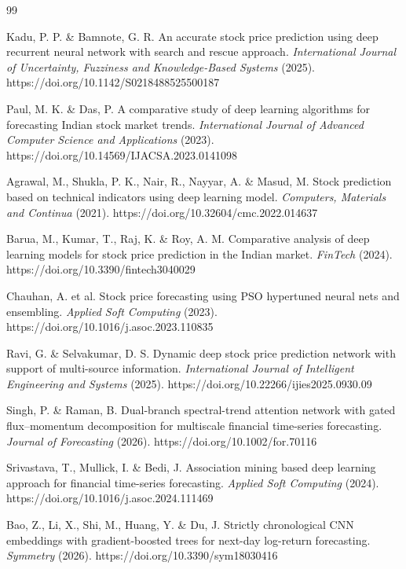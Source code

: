 \documentclass[fleqn,10pt]{wlscirep}
\begin{document}
\begin{thebibliography}{99}

Kadu, P. P. \& Bamnote, G. R. An accurate stock price prediction using deep recurrent neural network with search and rescue approach. \textit{International Journal of Uncertainty, Fuzziness and Knowledge-Based Systems} (2025). https://doi.org/10.1142/S0218488525500187

Paul, M. K. \& Das, P. A comparative study of deep learning algorithms for forecasting Indian stock market trends. \textit{International Journal of Advanced Computer Science and Applications} (2023). https://doi.org/10.14569/IJACSA.2023.0141098

Agrawal, M., Shukla, P. K., Nair, R., Nayyar, A. \& Masud, M. Stock prediction based on technical indicators using deep learning model. \textit{Computers, Materials and Continua} (2021). https://doi.org/10.32604/cmc.2022.014637

Barua, M., Kumar, T., Raj, K. \& Roy, A. M. Comparative analysis of deep learning models for stock price prediction in the Indian market. \textit{FinTech} (2024). https://doi.org/10.3390/fintech3040029

Chauhan, A. et al. Stock price forecasting using PSO hypertuned neural nets and ensembling. \textit{Applied Soft Computing} (2023). https://doi.org/10.1016/j.asoc.2023.110835

Ravi, G. \& Selvakumar, D. S. Dynamic deep stock price prediction network with support of multi-source information. \textit{International Journal of Intelligent Engineering and Systems} (2025). https://doi.org/10.22266/ijies2025.0930.09

Singh, P. \& Raman, B. Dual-branch spectral-trend attention network with gated flux--momentum decomposition for multiscale financial time-series forecasting. \textit{Journal of Forecasting} (2026). https://doi.org/10.1002/for.70116

Srivastava, T., Mullick, I. \& Bedi, J. Association mining based deep learning approach for financial time-series forecasting. \textit{Applied Soft Computing} (2024). https://doi.org/10.1016/j.asoc.2024.111469

Bao, Z., Li, X., Shi, M., Huang, Y. \& Du, J. Strictly chronological CNN embeddings with gradient-boosted trees for next-day log-return forecasting. \textit{Symmetry} (2026). https://doi.org/10.3390/sym18030416


\end{thebibliography}
\end{document}
